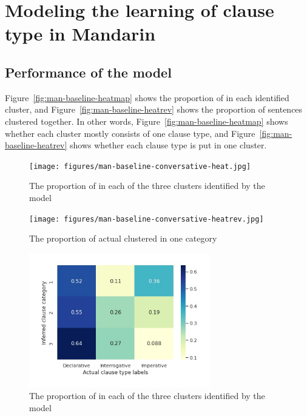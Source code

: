 \section{Modeling the learning of clause type in 
Mandarin}
\label{sec:mancl:model}


\subsection{Performance of the \dlearnerabbr{} model}
\label{sec:mancl:model:results:d}

Figure~\ref{fig:man-baseline-heatmap} shows the proportion of \diis{} in each identified cluster, and Figure~\ref{fig:man-baseline-heatrev} shows the proportion of sentences clustered together. In other words, Figure~\ref{fig:man-baseline-heatmap} shows whether each cluster mostly consists of one clause type, and Figure~\ref{fig:man-baseline-heatrev} shows whether each clause type is put in one cluster.  



\begin{figure}[H]
    \centering
    \texttt{[image: figures/man-baseline-conversative-heat.jpg]}
    \caption{The proportion of \diis{} in each of the three clusters identified by the \dlearnerabbr{} model}
    \label{fig:man-baseline-conversative-heat}
\end{figure}


\begin{figure}[H]
    \centering
    \texttt{[image: figures/man-baseline-conversative-heatrev.jpg]}
    \caption{The proportion of actual \diis{} clustered in one category}
    \label{fig:man-baseline-conversative-heatrev}
\end{figure}

\begin{figure}[H]
    \centering
    \includegraphics[width=0.7\textwidth]{figures/man-baseline-mid-heat.jpg}
    \caption{The proportion of \diis{} in each of the three clusters identified by the \dlearnerabbr{} model}
    \label{fig:man-baseline-mid-heat}
\end{figure}


